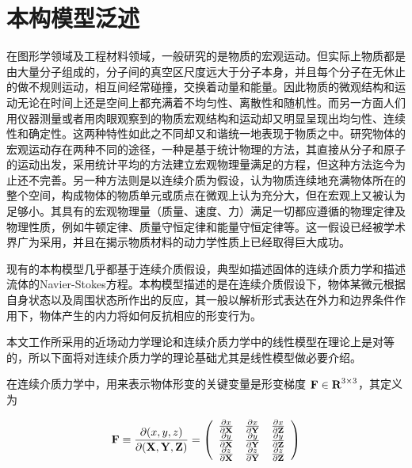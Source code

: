 \section{本构模型泛述}
\label{constitutive_model}
在图形学领域及工程材料领域，一般研究的是物质的宏观运动。但实际上物质都是由大量分子组成的，分子间的真空区尺度远大于分子本身，并且每个分子在无休止的做不规则运动，相互间经常碰撞，交换着动量和能量。因此物质的微观结构和运动无论在时间上还是空间上都充满着不均匀性、离散性和随机性。而另一方面人们用仪器测量或者用肉眼观察到的物质宏观结构和运动却又明显呈现出均匀性、连续性和确定性。这两种特性如此之不同却又和谐统一地表现于物质之中。研究物体的宏观运动存在两种不同的途径，一种是基于统计物理的方法，其直接从分子和原子的运动出发，采用统计平均的方法建立宏观物理量满足的方程，但这种方法迄今为止还不完善。另一种方法则是以连续介质为假设，认为物质连续地充满物体所在的整个空间，构成物体的物质单元或质点在微观上认为充分大，但在宏观上又被认为足够小。其具有的宏观物理量（质量、速度、力）满足一切都应遵循的物理定律及物理性质，例如牛顿定律、质量守恒定律和能量守恒定律等。这一假设已经被学术界广为采用，并且在揭示物质材料的动力学性质上已经取得巨大成功。

现有的本构模型几乎都基于连续介质假设，典型如描述固体的连续介质力学和描述流体的Navier-Stokes方程。本构模型描述的是在连续介质假设下，物体某微元根据自身状态以及周围状态所作出的反应，其一般以解析形式表达在外力和边界条件作用下，物体产生的内力将如何反抗相应的形变行为。

本文工作所采用的近场动力学理论和连续介质力学中的线性模型在理论上是对等的，所以下面将对连续介质力学的理论基础尤其是线性模型做必要介绍。

在连续介质力学中，用来表示物体形变的关键变量是形变梯度 $\textbf{F} \in \textbf{R}^{3\times3}$，其定义为

\begin{equation}
\textbf{F} \equiv \frac{\partial(\boldmath{x}, \boldmath{y}, \boldmath{z})}{\partial(\textbf{X}, \textbf{Y}, \textbf{Z})}
=
\left(
  \begin{array}{ccc}
    \frac{\partial\boldmath{x}}{\partial\textbf{X}}& \frac{\partial\boldmath{x}}{\partial\textbf{Y}} & \frac{\partial\boldmath{x}}{\partial\textbf{Z}} \\
    \frac{\partial\boldmath{y}}{\partial\textbf{X}}& \frac{\partial\boldmath{y}}{\partial\textbf{Y}} & \frac{\partial\boldmath{y}}{\partial\textbf{Z}} \\
    \frac{\partial\boldmath{z}}{\partial\textbf{X}}& \frac{\partial\boldmath{z}}{\partial\textbf{Y}} & \frac{\partial\boldmath{z}}{\partial\textbf{Z}} \\
  \end{array}
\right)
\end{equation}

